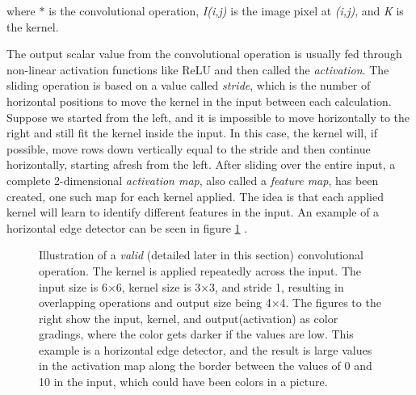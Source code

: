     where $*$ is the convolutional operation, \textit{I(i,j)} is the image pixel at \textit{(i,j)}, and \textit{K} is the kernel.
     
    The output scalar value from the convolutional operation is usually fed through non-linear activation functions like ReLU and then called the \textit{activation}. The sliding operation is based on a value called \textit{stride}, which is the number of horizontal positions to move the kernel in the input between each calculation. Suppose we started from the left, and it is impossible to move horizontally to the right and still fit the kernel inside the input. In this case, the kernel will, if possible, move rows down vertically equal to the stride and then continue horizontally, starting afresh from the left. After sliding over the entire input, a complete 2-dimensional \textit{activation map}, also called a \textit{feature map}, has been created, one such map for each kernel applied. The idea is that each applied kernel will learn to identify different features in the input. An example of a horizontal edge detector can be seen in figure \ref{convolutional_fig} \cite{o2015introduction_convolutions}. 
    \begin{figure}[H]
        \centering
                
        \caption[Horizontal edge detector example]{Illustration of a \textit{valid} (detailed later in this section) convolutional operation. The kernel is applied repeatedly across the input. The input size is 6×6, kernel size is 3×3, and stride 1, resulting in overlapping operations and output size being 4×4. The figures to the right show the input, kernel, and output(activation) as color gradings, where the color gets darker if the values are low. This example is a horizontal edge detector, and the result is large values in the activation map along the border between the values of 0 and 10 in the input, which could have been colors in a picture.}
      	\medskip 
        \label{convolutional_fig}
    \end{figure}
    
